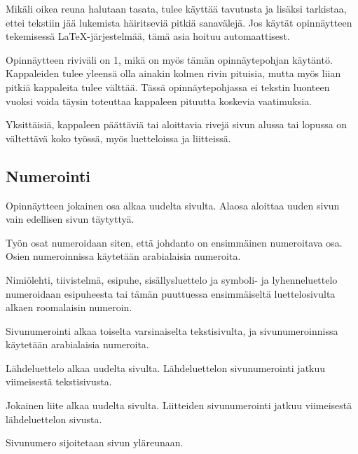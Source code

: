 \documentclass[english,12pt,a4paper,dvips]{article}
\begin{document}
Mikäli oikea reuna halutaan tasata, tulee käyttää tavutusta ja lisäksi
tarkistaa, ettei tekstiin jää lukemista häiritseviä pitkiä sanavälejä. Jos
käytät opinnäytteen tekemisessä \LaTeX-järjestelmää, 
tämä asia hoituu automaattisest.

Opinnäytteen riviväli on 1, mikä on myös tämän opinnäytepohjan käytäntö. 
Kappaleiden tulee yleensä olla ainakin kolmen rivin pituisia, mutta
myös liian pitkiä kappaleita tulee välttää.  Tässä opinnäytepohjassa
ei tekstin luonteen vuoksi voida täysin toteuttaa kappaleen pituutta koskevia
vaatimuksia.

Yksittäisiä, kappaleen päättäviä tai aloittavia rivejä sivun alussa
tai lopussa on vältettävä koko työssä, myös luetteloissa ja
liitteissä.

\subsection*{Numerointi}

Opinnäytteen jokainen osa alkaa uudelta sivulta. Alaosa aloittaa uuden
sivun vain edellisen sivun täytyttyä.

Työn osat numeroidaan siten, että johdanto on ensimmäinen numeroitava
osa. Osien numeroinnissa käytetään arabialaisia numeroita.

Nimiölehti, tiivistelmä, esipuhe, sisällysluettelo ja symboli- ja
lyhenneluettelo numeroidaan esipuheesta tai tämän puuttuessa 
ensimmäiseltä luettelosivulta alkaen roomalaisin numeroin.

Sivunumerointi alkaa toiselta varsinaiselta tekstisivulta, ja 
sivunumeroinnissa käytetään arabialaisia numeroita.

Lähdeluettelo alkaa uudelta sivulta. Lähdeluettelon sivunumerointi 
jatkuu viimeisestä tekstisivusta.

Jokainen liite alkaa uudelta sivulta. Liitteiden sivunumerointi
jatkuu viimeisestä lähdeluettelon sivusta.

Sivunumero sijoitetaan sivun yläreunaan.
\end{document}
